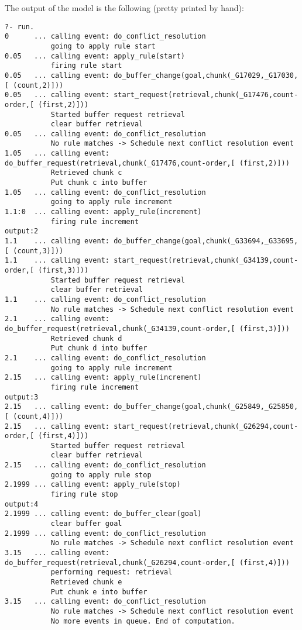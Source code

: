 The output of the model is the following (pretty printed by hand):

\begin{lstlisting}
?- run.
0      ... calling event: do_conflict_resolution
           going to apply rule start
0.05   ... calling event: apply_rule(start)
           firing rule start
0.05   ... calling event: do_buffer_change(goal,chunk(_G17029,_G17030,[ (count,2)]))
0.05   ... calling event: start_request(retrieval,chunk(_G17476,count-order,[ (first,2)]))
           Started buffer request retrieval
           clear buffer retrieval
0.05   ... calling event: do_conflict_resolution
           No rule matches -> Schedule next conflict resolution event
1.05   ... calling event: do_buffer_request(retrieval,chunk(_G17476,count-order,[ (first,2)]))
           Retrieved chunk c
           Put chunk c into buffer
1.05   ... calling event: do_conflict_resolution
           going to apply rule increment
1.1:0  ... calling event: apply_rule(increment)
           firing rule increment
output:2
1.1    ... calling event: do_buffer_change(goal,chunk(_G33694,_G33695,[ (count,3)]))
1.1    ... calling event: start_request(retrieval,chunk(_G34139,count-order,[ (first,3)]))
           Started buffer request retrieval
           clear buffer retrieval
1.1    ... calling event: do_conflict_resolution
           No rule matches -> Schedule next conflict resolution event
2.1    ... calling event: do_buffer_request(retrieval,chunk(_G34139,count-order,[ (first,3)]))
           Retrieved chunk d
           Put chunk d into buffer
2.1    ... calling event: do_conflict_resolution
           going to apply rule increment
2.15   ... calling event: apply_rule(increment)
           firing rule increment
output:3
2.15   ... calling event: do_buffer_change(goal,chunk(_G25849,_G25850,[ (count,4)]))
2.15   ... calling event: start_request(retrieval,chunk(_G26294,count-order,[ (first,4)]))
           Started buffer request retrieval
           clear buffer retrieval
2.15   ... calling event: do_conflict_resolution
           going to apply rule stop
2.1999 ... calling event: apply_rule(stop)
           firing rule stop
output:4
2.1999 ... calling event: do_buffer_clear(goal)
           clear buffer goal
2.1999 ... calling event: do_conflict_resolution
           No rule matches -> Schedule next conflict resolution event
3.15   ... calling event: do_buffer_request(retrieval,chunk(_G26294,count-order,[ (first,4)]))
           performing request: retrieval
           Retrieved chunk e
           Put chunk e into buffer
3.15   ... calling event: do_conflict_resolution
           No rule matches -> Schedule next conflict resolution event
           No more events in queue. End of computation.
\end{lstlisting}

